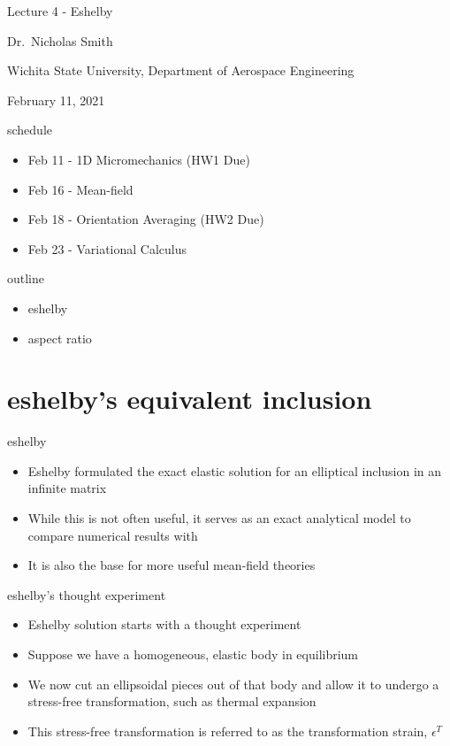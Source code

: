 \documentclass[
  letterpaper,
  ignorenonframetext,
  aspectratio=43,
  handout,
  12pt]{beamer}
\author{}
\date{}
\providecommand{\tightlist}{%
  \setlength{\itemsep}{0pt}\setlength{\parskip}{0pt}}
\providecommand{\tightlist}{%
\setlength{\itemsep}{0pt}\setlength{\parskip}{0pt}}
\begin{document}
\begin{frame}
Lecture 4 - Eshelby

Dr.~Nicholas Smith

Wichita State University, Department of Aerospace Engineering

February 11, 2021
\end{frame}

\begin{frame}{schedule}
\protect\hypertarget{schedule}{}
\begin{itemize}
\tightlist
\item
  Feb 11 - 1D Micromechanics (HW1 Due)
\item
  Feb 16 - Mean-field
\item
  Feb 18 - Orientation Averaging (HW2 Due)
\item
  Feb 23 - Variational Calculus
\end{itemize}
\end{frame}

\begin{frame}{outline}
\protect\hypertarget{outline}{}
\begin{itemize}
\tightlist
\item
  eshelby
\item
  aspect ratio
\end{itemize}
\end{frame}

\hypertarget{eshelbys-equivalent-inclusion}{%
\section{eshelby's equivalent
inclusion}\label{eshelbys-equivalent-inclusion}}

\begin{frame}{eshelby}
\protect\hypertarget{eshelby}{}
\begin{itemize}
\tightlist
\item
  Eshelby formulated the exact elastic solution for an elliptical
  inclusion in an infinite matrix
\item
  While this is not often useful, it serves as an exact analytical model
  to compare numerical results with
\item
  It is also the base for more useful mean-field theories
\end{itemize}
\end{frame}

\begin{frame}{eshelby's thought experiment}
\protect\hypertarget{eshelbys-thought-experiment}{}
\begin{itemize}
\tightlist
\item
  Eshelby solution starts with a thought experiment
\item
  Suppose we have a homogeneous, elastic body in equilibrium
\item
  We now cut an ellipsoidal pieces out of that body and allow it to
  undergo a stress-free transformation, such as thermal expansion
\item
  This stress-free transformation is referred to as the transformation
  strain, \(\epsilon^T\)
\end{itemize}
\end{frame}
\end{document}
